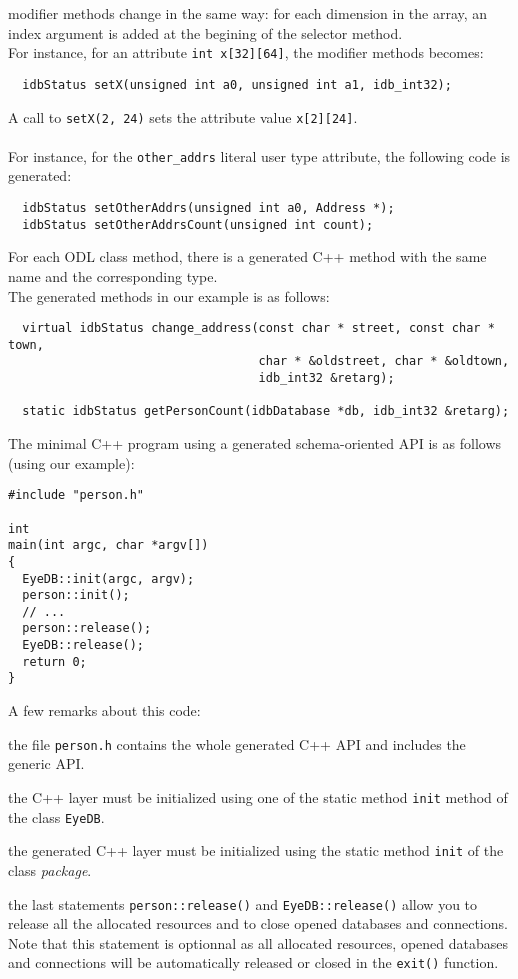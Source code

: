 modifier methods change in the same way: for each dimension in the
array, an index argument is added at the begining of the selector method.
\\
For instance, for an attribute \texttt{int x[32][64]}, the modifier methods
becomes:
\verbsize
\begin{verbatim}
  idbStatus setX(unsigned int a0, unsigned int a1, idb_int32);
\end{verbatim}
\normalsize
A call to \texttt{setX(2, 24)} sets the attribute value \texttt{x[2][24]}.
\\
\\
For instance,
for the \texttt{other\_addrs} literal user type attribute, the following
code is generated:
\verbsize
\begin{verbatim}
  idbStatus setOtherAddrs(unsigned int a0, Address *);
  idbStatus setOtherAddrsCount(unsigned int count);
\end{verbatim}
\normalsize
{}
For each ODL class method, there is a generated C++ method with
the same name and the corresponding type.
\\
The generated methods in our example is as follows:
\verbsize
\begin{verbatim}
  virtual idbStatus change_address(const char * street, const char * town,
                                   char * &oldstreet, char * &oldtown,
                                   idb_int32 &retarg);

  static idbStatus getPersonCount(idbDatabase *db, idb_int32 &retarg);
\end{verbatim}
\normalsize


The minimal \eyedb C++ program using a generated schema-oriented API
is as follows (using our example):
\verbsize
\begin{verbatim}
#include "person.h"

int
main(int argc, char *argv[])
{
  EyeDB::init(argc, argv);
  person::init();
  // ...
  person::release();
  EyeDB::release();
  return 0;
}
\end{verbatim}
\normalsize
A few remarks about this code:
\be
\item the file \texttt{person.h} contains the whole generated C++ API and
includes the generic \eyedb API.
\item the \eyedb C++ layer must be initialized using one of the static method
\texttt{init} method of the class \texttt{EyeDB}.
\item the generated C++ layer must be initialized using the static method
\texttt{init} of the class \emph{package}.
\item the last statements \texttt{person::release()} and \texttt{EyeDB::release()}
allow you to release all the allocated resources and to close opened databases
and connections.
\\
Note that this statement is optionnal as all allocated resources,
opened databases and connections will be automatically released or closed
in the \texttt{exit()} function.
\ee

